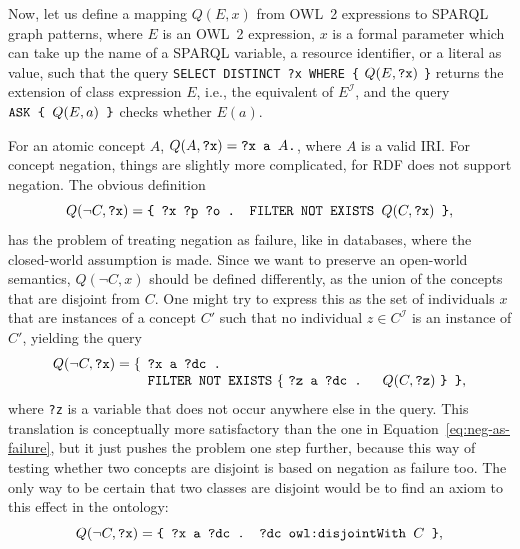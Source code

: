 \documentclass{llncs}
\begin{document}
Now, let us define a mapping $Q(E, x)$ from OWL~2 expressions to SPARQL graph patterns,
where $E$ is an OWL~2 expression, $x$ is a formal parameter which can take up
the name of a SPARQL variable, a resource identifier, or a literal as value,
such that the query
\texttt{SELECT DISTINCT ?x WHERE \{} $Q(E, \mbox{\tt ?x})$ \texttt{\}}
returns the extension of class expression $E$, i.e., the equivalent of $E^\mathcal{I}$,
and the query $\mbox{\tt ASK \{ } Q(E, a) \mbox{\tt\ \}}$ checks whether $E(a)$.

For an atomic concept $A$, $Q(A, \mbox{\tt ?x}) = \mbox{\tt ?x a }A\mbox{\tt .}$,
where $A$ is a valid IRI.
For concept negation, things are slightly more complicated, for RDF does not support
negation.
The obvious definition
\begin{equation}\label{eq:neg-as-failure}
  Q(\neg C, \mbox{\tt ?x}) =
    \mbox{\tt \{ ?x ?p ?o . FILTER NOT EXISTS } Q(C, \mbox{\tt ?x}) \mbox{\tt\ \}},
\end{equation}
has the problem of treating negation as failure, like in databases,
where the closed-world assumption is made. 
Since we want to preserve an open-world semantics, $Q(\neg C, x)$ should be defined
differently, as the union of the concepts that are disjoint from $C$.
One might try to express this as the set of individuals $x$ that are instances of a
concept $C'$ such that no individual $z\in C^\mathcal{I}$ is an instance of $C'$,
yielding the query
\begin{equation}\label{eq:approx-open-world-negation}
  Q(\neg C, \mbox{\tt ?x}) =
  \begin{minipage}[t]{5in}
    \begin{tabbing}
      \quad\=\quad\=\quad\=\kill
      \{\>\texttt{?x a ?dc .}\\
        \>\texttt{FILTER NOT EXISTS} \{ \texttt{?z a ?dc . } $Q(C, \mbox{\tt ?z})$ \texttt{\} \}},
    \end{tabbing}
  \end{minipage}
\end{equation}
where \texttt{?z} is a variable that does not occur anywhere else in the query.
This translation is conceptually more satisfactory than the one in Equation~\ref{eq:neg-as-failure},
but it just pushes the problem one step further, because this way of testing whether
two concepts are disjoint is based on negation as failure too.
The only way to be certain that two classes are disjoint would be to find an axiom to
this effect in the ontology:
\begin{equation}\label{eq:negation-with-disjointWith}
  Q(\neg C, \mbox{\tt ?x}) =
    \mbox{\tt \{ ?x a ?dc . ?dc owl:disjointWith }
    C \mbox{\tt\ \}},
\end{equation}
\end{document}
